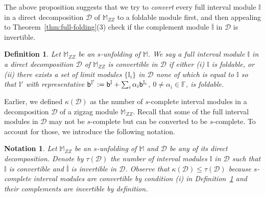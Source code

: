 \documentclass[11pt]{article}
\theoremstyle{plain}%
\newtheorem{definition}{Definition}[section]
\newtheorem{notation}{Notation}[section]
\newcommand{\Int}{\mathbb{I}}
\newcommand{\M}{\mathbb{M}}
\newcommand{\D}{\mathcal{D}}
\newcommand{\bs}{{\sf b}}
\begin{document}
The above proposition suggests that we try to \emph{convert} every full interval module $\Int$ in a direct decomposition $\D$ of $\M_{ZZ}$ to a foldable module first, and then appealing
to Theorem~\ref{thm:full-folding}(3) check if the complement module
$\overline{\Int}$ in $\D$ is invertible.

\begin{definition}
    Let $\M_{ZZ}$ be an $s$-unfolding of $\M$.
    We say a full interval module $\Int$ in a direct decomposition $\D$ of $\M_{ZZ}$ is \emph{convertible} in $\D$ if either (i) $\Int$ is foldable, or (ii) there exists a set of limit modules 
    $\{\Int_i\}$ in $\D$ none of which is equal to $\Int$ so that $\Int'$ with
    representative $\bs^{\Int'}:=\bs^\Int + \sum_i \alpha_i\bs^{\Int_i}$, $0\not=\alpha_i\in \mathbb{F}$, is foldable.
    \label{def:convertible}
\end{definition}
Earlier, we defined $\kappa(\D)$ as the number of $s$-complete interval modules
in a decomposition $\D$ of a zigzag module $\M_{ZZ}$. Recall that some
of the full interval modules in $\D$ may not be $s$-complete but can be converted
to be $s$-complete. To account for those, we introduce the following notation.
\begin{notation}
    Let $\M_{ZZ}$ be an $s$-unfolding of $\M$ and $\D$ be any of its direct decomposition. Denote by $\tau(\D)$ the number of interval modules $\Int$ in $\D$ such that $\Int$ is convertible and $\bar{\Int}$ is invertible in $\D$. Observe that $\kappa(\D)\leq \tau(\D)$ because $s$-complete interval modules are convertible by condition (i) in Definition~\ref{def:convertible} and their complements are invertible by definition.
\end{notation}
\end{document}
